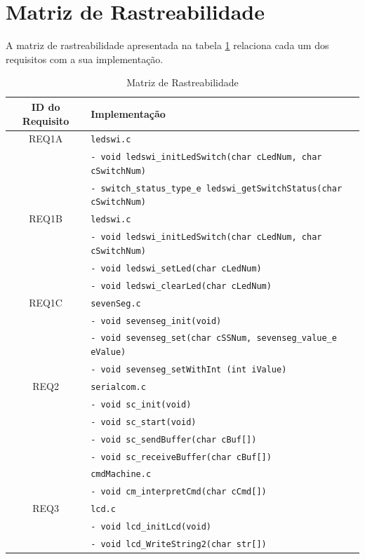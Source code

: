 \documentclass{article}
\begin{document}
\section{Matriz de Rastreabilidade}
A matriz de rastreabilidade apresentada na tabela \ref*{tab:rastreabilidade} relaciona cada um dos requisitos com a sua implementação.
\begin{table}[H]
	\centering
	\caption{Matriz de Rastreabilidade}
	\label{tab:rastreabilidade}
	\small
	\begin{tabular}{|c|l|}
		\hline \bfseries{ID do Requisito} & \bfseries{Implementação}\\ 
		\hline REQ1A 	& \texttt{ledswi.c}\\ 
						& \texttt{- void ledswi\_initLedSwitch(char cLedNum, char cSwitchNum)}\\
						& \texttt{- switch\_status\_type\_e ledswi\_getSwitchStatus(char cSwitchNum)}\\
		\hline REQ1B 	& \texttt{ledswi.c}\\ 
						& \texttt{- void ledswi\_initLedSwitch(char cLedNum, char cSwitchNum)}\\
						& \texttt{- void ledswi\_setLed(char cLedNum)}\\ 
						& \texttt{- void ledswi\_clearLed(char cLedNum)}\\
		\hline REQ1C 	& \texttt{sevenSeg.c}\\ 
						& \texttt{- void sevenseg\_init(void)}\\
						& \texttt{- void sevenseg\_set(char cSSNum, sevenseg\_value\_e eValue)}\\
						& \texttt{- void sevenseg\_setWithInt (int iValue)}\\
		\hline REQ2	 	& \texttt{serialcom.c}\\ 
						& \texttt{- void sc\_init(void)}\\
						& \texttt{- void sc\_start(void)}\\
						& \texttt{- void sc\_sendBuffer(char cBuf[])}\\
						& \texttt{- void sc\_receiveBuffer(char cBuf[])}\\
						& \texttt{cmdMachine.c}\\ 
						& \texttt{- void cm\_interpretCmd(char cCmd[])}\\
		\hline REQ3	 	& \texttt{lcd.c}\\ 
						& \texttt{- void lcd\_initLcd(void)}\\
						& \texttt{- void lcd\_WriteString2(char str[])}\\

\end{tabular}
\end{table}
\end{document}

